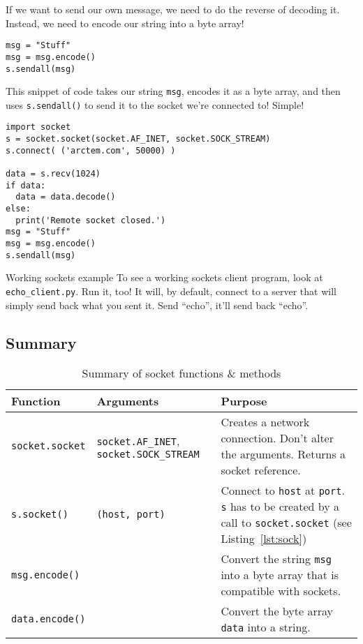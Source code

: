 \documentclass[11pt]{cselabheader}
\begin{document}
If we want to send our own message, we need to do the reverse of decoding it.
Instead, we need to encode our string into a byte array!

\begin{lstlisting}
msg = "Stuff"
msg = msg.encode()
s.sendall(msg)
\end{lstlisting}

This snippet of code takes our string \lstinline{msg}, encodes it as a byte
array, and then uses \lstinline{s.sendall()} to send it to the socket we're
connected to! Simple!

\begin{lstlisting}[style=python,label={lst:sock},caption={Code that shows usage, but does not
actually make sense}]
import socket
s = socket.socket(socket.AF_INET, socket.SOCK_STREAM)
s.connect( ('arctem.com', 50000) )

data = s.recv(1024)
if data:
  data = data.decode()
else:
  print('Remote socket closed.')
msg = "Stuff"
msg = msg.encode()
s.sendall(msg)
\end{lstlisting}


\begin{warningbox}{Working sockets example}
  To see a working sockets client program, look at
  \texttt{echo\_client.py}. Run it, too! It will, by default, connect to a
  server that will simply send back what you sent it. Send ``echo'', it'll send
  back ``echo''.
\end{warningbox}

\pagebreak
\subsection{Summary}

\begin{table}[!ht]
  \centering
  \begin{tabular}{p{2.5cm} p{3.3cm} p{10cm}}
    \toprule
    \bfseries Function & \bfseries Arguments & \bfseries Purpose \\
    \midrule
    \lstinline!socket.socket! & \lstinline!socket.AF_INET!, \lstinline!socket.SOCK_STREAM! &
    Creates a network connection. Don't alter the arguments. Returns a socket
    reference.\\
    \lstinline!s.socket()! & \lstinline!(host, port)! & Connect to
    \lstinline!host! at \lstinline!port!. \lstinline!s! has to be created by a
    call to \lstinline!socket.socket! (see Listing~\ref{lst:sock})\\
    \lstinline!msg.encode()! & & Convert the string \lstinline{msg} into a byte array
    that is compatible with sockets.\\
    \lstinline!data.encode()! & & Convert the byte array \lstinline{data} into a string.\\
    \bottomrule
  \end{tabular}
  \caption{Summary of socket functions \& methods}
  \label{tab:sum}
\end{table}
\end{document}
